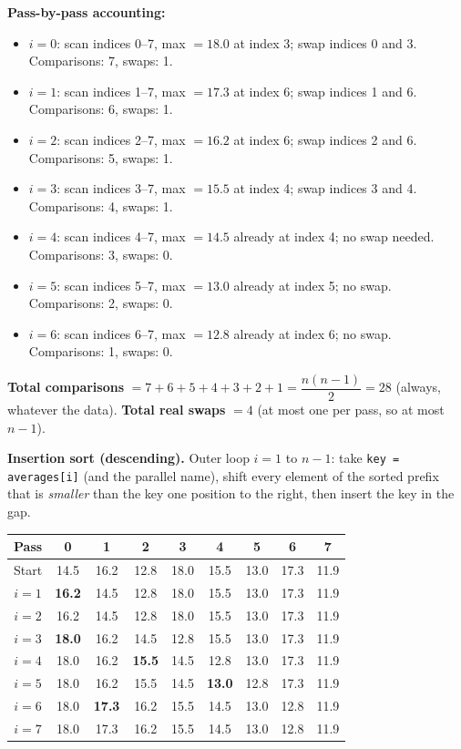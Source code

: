 \documentclass[11pt]{article}
\begin{document}
\begin{exemplebox}
\noindent\textbf{Pass-by-pass accounting:}
\begin{itemize}
    \item $i=0$: scan indices 0--7, max $=18.0$ at index 3; swap indices 0 and 3. Comparisons: 7, swaps: 1.
    \item $i=1$: scan indices 1--7, max $=17.3$ at index 6; swap indices 1 and 6. Comparisons: 6, swaps: 1.
    \item $i=2$: scan indices 2--7, max $=16.2$ at index 6; swap indices 2 and 6. Comparisons: 5, swaps: 1.
    \item $i=3$: scan indices 3--7, max $=15.5$ at index 4; swap indices 3 and 4. Comparisons: 4, swaps: 1.
    \item $i=4$: scan indices 4--7, max $=14.5$ already at index 4; no swap needed. Comparisons: 3, swaps: 0.
    \item $i=5$: scan indices 5--7, max $=13.0$ already at index 5; no swap. Comparisons: 2, swaps: 0.
    \item $i=6$: scan indices 6--7, max $=12.8$ already at index 6; no swap. Comparisons: 1, swaps: 0.
\end{itemize}

\noindent\textbf{Total comparisons} $= 7+6+5+4+3+2+1 = \dfrac{n(n-1)}{2} = 28$ (always, whatever the data). \textbf{Total real swaps} $= 4$ (at most one per pass, so at most $n-1$).

\medskip
\noindent\textbf{Insertion sort (descending).} Outer loop $i = 1$ to $n-1$: take \texttt{key = averages[i]} (and the parallel name), shift every element of the sorted prefix that is \emph{smaller} than the key one position to the right, then insert the key in the gap.

\begin{center}
\begin{tabular}{|c|c|c|c|c|c|c|c|c|}
\hline
\rowcolor{popblueL}\textbf{Pass} & 0 & 1 & 2 & 3 & 4 & 5 & 6 & 7 \\
\hline
Start & 14.5 & 16.2 & 12.8 & 18.0 & 15.5 & 13.0 & 17.3 & 11.9 \\
\hline
$i=1$ & \textbf{16.2} & 14.5 & 12.8 & 18.0 & 15.5 & 13.0 & 17.3 & 11.9 \\
$i=2$ & 16.2 & 14.5 & 12.8 & 18.0 & 15.5 & 13.0 & 17.3 & 11.9 \\
$i=3$ & \textbf{18.0} & 16.2 & 14.5 & 12.8 & 15.5 & 13.0 & 17.3 & 11.9 \\
$i=4$ & 18.0 & 16.2 & \textbf{15.5} & 14.5 & 12.8 & 13.0 & 17.3 & 11.9 \\
$i=5$ & 18.0 & 16.2 & 15.5 & 14.5 & \textbf{13.0} & 12.8 & 17.3 & 11.9 \\
$i=6$ & 18.0 & \textbf{17.3} & 16.2 & 15.5 & 14.5 & 13.0 & 12.8 & 11.9 \\
$i=7$ & 18.0 & 17.3 & 16.2 & 15.5 & 14.5 & 13.0 & 12.8 & 11.9 \\
\hline
\end{tabular}
\end{center}


\end{exemplebox}
\end{document}

